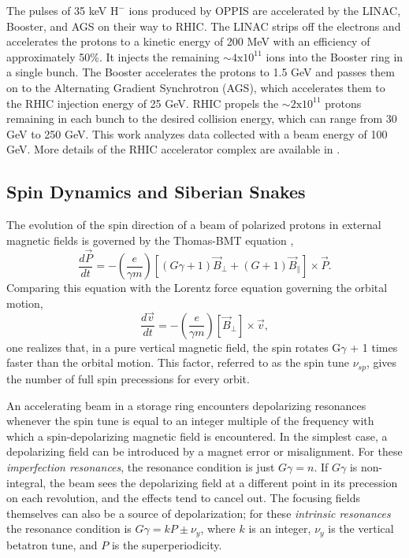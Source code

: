 The pulses of 35 keV $\mathrm{H^-}$ ions produced by OPPIS are accelerated by
the LINAC, Booster, and AGS on their way to RHIC. The LINAC strips off the
electrons and accelerates the protons to a kinetic energy of 200 MeV with an
efficiency of approximately 50\%. It injects the remaining $\sim
\mathrm{4x10^{11}}$ ions into the Booster ring in a single bunch. The Booster
accelerates the protons to 1.5 GeV and passes them on to the Alternating
Gradient Synchrotron (AGS), which accelerates them to the RHIC injection
energy of 25 GeV. RHIC propels the $\sim \mathrm{2x10^{11}}$ protons remaining
in each bunch to the desired collision energy, which can range from 30 GeV to
250 GeV. This work analyzes data collected with a beam energy of 100 GeV. More
details of the RHIC accelerator complex are available in \cite{Harrison:2003sb}.

\subsection{Spin Dynamics and Siberian Snakes}

The evolution of the spin direction of a beam of polarized protons in external
magnetic fields is governed by the Thomas-BMT equation \cite{Thomas:1927yu,
Bargmann:1959gz},
%
\begin{equation}
  \frac{d\vec{P}}{dt} = -\left(\frac{e}{\gamma m}\right)[(G\gamma + 1) \vec{B}_{\perp} + (G + 1) \vec{B}_{\parallel}] \times \vec{P}.
\end{equation}
%
Comparing this equation with the Lorentz force equation governing the orbital
motion,
%
\begin{equation}
  \frac{d\vec{v}}{dt} = -\left(\frac{e}{\gamma m}\right)[\vec{B}_{\perp}] \times \vec{v},
\end{equation}
%
one realizes that, in a pure vertical magnetic field, the spin rotates
G$\gamma$ + 1 times faster than the orbital motion. This factor, referred to
as the spin tune $\nu_{sp}$, gives the number of full spin precessions for
every orbit.

An accelerating beam in a storage ring encounters depolarizing resonances
whenever the spin tune is equal to an integer multiple of the frequency with
which a spin-depolarizing magnetic field is encountered. In the simplest case,
a depolarizing field can be introduced by a magnet error or misalignment. For
these \textit{imperfection resonances}, the resonance condition is just
$G\gamma = n$. If $G\gamma$ is non-integral, the beam sees the depolarizing
field at a different point in its precession on each revolution, and the
effects tend to cancel out. The focusing fields themselves can also be a
source of depolarization; for these \textit{intrinsic resonances} the
resonance condition is $G\gamma = kP \pm \nu_y$, where $k$ is an integer,
$\nu_y$ is the vertical betatron tune, and $P$ is the superperiodicity.

